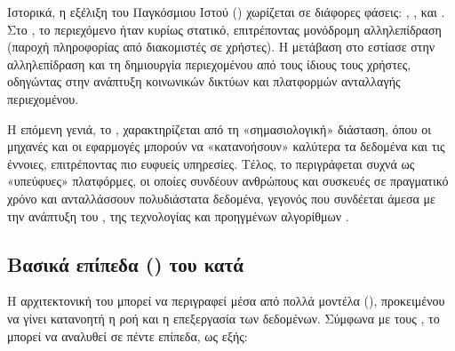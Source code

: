 Ιστορικά, η εξέλιξη του Παγκόσμιου Ιστού () χωρίζεται σε διάφορες φάσεις:
, ,  και . Στο , το περιεχόμενο
ήταν κυρίως στατικό, επιτρέποντας μονόδρομη αλληλεπίδραση (παροχή πληροφορίας από
διακομιστές σε χρήστες). Η μετάβαση στο  εστίασε στην αλληλεπίδραση και τη
δημιουργία περιεχομένου από τους ίδιους τους χρήστες, οδηγώντας στην ανάπτυξη κοινωνικών
δικτύων και πλατφορμών ανταλλαγής περιεχομένου.

Η επόμενη γενιά, το , χαρακτηρίζεται από τη «σημασιολογική» διάσταση, όπου οι
μηχανές και οι εφαρμογές μπορούν να «κατανοήσουν» καλύτερα τα δεδομένα και τις έννοιες,
επιτρέποντας πιο ευφυείς υπηρεσίες. Τέλος, το  περιγράφεται συχνά ως
«υπεύφυες» πλατφόρμες, οι οποίες συνδέουν ανθρώπους και συσκευές σε πραγματικό χρόνο
και ανταλλάσσουν πολυδιάστατα δεδομένα, γεγονός που συνδέεται άμεσα με την ανάπτυξη του
, της  τεχνολογίας και προηγμένων αλγορίθμων .

\subsection{Βασικά επίπεδα () του  κατά }

Η αρχιτεκτονική του  μπορεί να περιγραφεί μέσα από πολλά μοντέλα (),
προκειμένου να γίνει κατανοητή η ροή και η επεξεργασία των δεδομένων. Σύμφωνα με τους
 \cite{atzori_internet_2010}, το  μπορεί να αναλυθεί σε πέντε επίπεδα, ως εξής:

